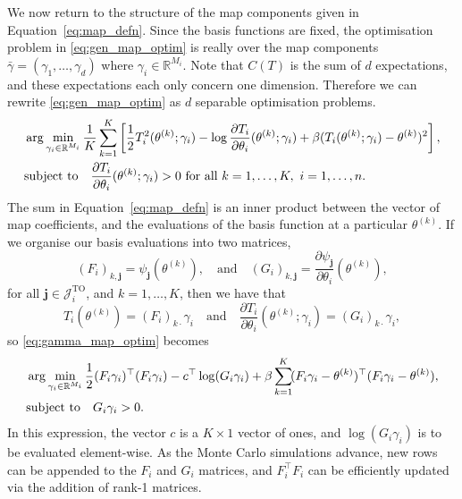 \documentclass[final]{siamltex}
\begin{document}
We now return to the structure of the map components given in Equation~\eqref{eq:map_defn}. Since the basis functions are
fixed, the optimisation problem in \eqref{eq:gen_map_optim} is really over the map components $\bar{\gamma} = (\gamma_1, \dots,
\gamma_d)$ where $\gamma_i \in \mathbb{R}^{M_i}$. Note that $C(T)$ is the sum of $d$ expectations, and these expectations each only concern one dimension. Therefore we can rewrite \eqref{eq:gen_map_optim} as $d$ separable optimisation problems.
\begin{align}\label{eq:gamma_map_optim}
	&\arg\min_{\gamma_i\in\mathbb{R}^{M_i}} \frac{1}{K}\sum\limits_{k=1}^K
		\left[\frac{1}{2}T_i^2(\theta^{(k)}; \gamma_i) - \log\frac{\partial T_i}{\partial\theta_i}(\theta^{(k)}; \gamma_i) + \beta(T_i(\theta^{(k)};
		\gamma_i)-\theta^{(k)})^2\right], \\
	&\text{subject to} \quad \frac{\partial T_i}{\partial\theta_i}(\theta^{(k)};
		\gamma_i) > 0 \ \text{for all}\ k=1,\dots,K,\ i=1,\dots,n.
		\notag
\end{align}
The sum in Equation~\eqref{eq:map_defn} is an inner
product between the vector of map coefficients, and the evaluations of the basis function at a
particular $\theta^{(k)}$. If we organise our basis evaluations into two matrices,
\[
	(F_i)_{k,\mathbf{j}} = \psi_\mathbf{j}(\theta^{(k)}), \quad \text{and} \quad (G_i)_{k,\mathbf{j}} =
\frac{\partial\psi_\mathbf{j}}{\partial\theta_i}(\theta^{(k)}),
\]
for all $\mathbf{j}
\in \mathcal{J}_i^\text{TO}$, and $k = 1,\dots,K$, then we have that
\[
	T_i(\theta^{(k)}) = (F_i)_{k\cdot}\gamma_i \quad \text{and} \quad \frac{\partial T_i}{\partial \theta_i}(\theta^{(k)}; \gamma_i) = (G_i)_{k\cdot}\gamma_i,
\]
so \eqref{eq:gamma_map_optim} becomes
\begin{align}\label{eq:blas_map_optim}
	&\arg\min_{\gamma_i\in\mathbb{R}^{M_i}} \frac{1}{2}(F_i\gamma_i)^\top(F_i\gamma_i) -
		c^\top\log(G_i\gamma_i) + \beta\sum\limits_{k=1}^K \!
		(F_i\gamma_i-\theta^{(k)})^\top(F_i\gamma_i-\theta^{(k)}), \\
	&\text{subject to} \quad G_i\gamma_i > 0. \notag
\end{align}
In this expression, the vector $c$ is a $K\times 1$ vector of ones, and $\log(G_i\gamma_i)$ is to be
evaluated element-wise. As the Monte Carlo simulations advance, new rows can be appended to the
$F_i$ and $G_i$ matrices, and $F_i^\top F_i$ can be efficiently updated via the addition of rank-1 matrices.
\end{document}
